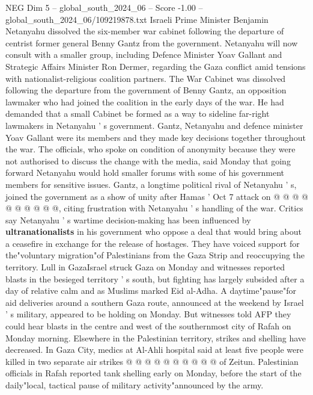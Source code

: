 \begin{textsample}{NEG Dim 5 – global\_south\_2024\_06 – Score -1.00 – global\_south\_2024\_06/109219878.txt}  \label{ex:f5_neg_230}
Israeli Prime Minister Benjamin Netanyahu dissolved the six-member war cabinet following the departure of centrist former general Benny Gantz from the government.
Netanyahu will now consult with a smaller group, including Defence Minister Yoav Gallant and Strategic Affairs Minister Ron Dermer, regarding the Gaza conflict amid tensions with nationalist-religious coalition partners.
The War Cabinet was dissolved following the departure from the government of Benny Gantz, an opposition lawmaker who had joined the coalition in the early days of the war.
He had demanded that a small Cabinet be formed as a way to sideline far-right lawmakers in Netanyahu ' s government.
Gantz, Netanyahu and defence minister Yoav Gallant were its members and they made key decisions together throughout the war.
The officials, who spoke on condition of anonymity because they were not authorised to discuss the change with the media, said Monday that going forward Netanyahu would hold smaller forums with some of his government members for sensitive issues.
Gantz, a longtime political rival of Netanyahu ' s, joined the government as a show of unity after Hamas ' Oct 7 attack on @ @ @ @ @ @ @ @ @ @, citing frustration with Netanyahu ' s handling of the war.
Critics say Netanyahu ' s wartime decision-making has been influenced by \textbf{ultranationalists} in his government who oppose a deal that would bring about a ceasefire in exchange for the release of hostages.
They have voiced support for the"voluntary migration"of Palestinians from the Gaza Strip and reoccupying the territory.
Lull in GazaIsrael struck Gaza on Monday and witnesses reported blasts in the besieged territory ' s south, but fighting has largely subsided after a day of relative calm and as Muslims marked Eid al-Adha.
A daytime"pause"for aid deliveries around a southern Gaza route, announced at the weekend by Israel ' s military, appeared to be holding on Monday.
But witnesses told AFP they could hear blasts in the centre and west of the southernmost city of Rafah on Monday morning.
Elsewhere in the Palestinian territory, strikes and shelling have decreased.
In Gaza City, medics at Al-Ahli hospital said at least five people were killed in two separate air strikes @ @ @ @ @ @ @ @ @ @ of Zeitun.
Palestinian officials in Rafah reported tank shelling early on Monday, before the start of the daily"local, tactical pause of military activity"announced by the army.

\end{textsample}

